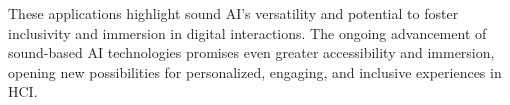 These applications highlight sound AI’s versatility and potential to foster inclusivity and immersion in digital interactions. The ongoing advancement of sound-based AI technologies promises even greater accessibility and immersion, opening new possibilities for personalized, engaging, and inclusive experiences in HCI.

